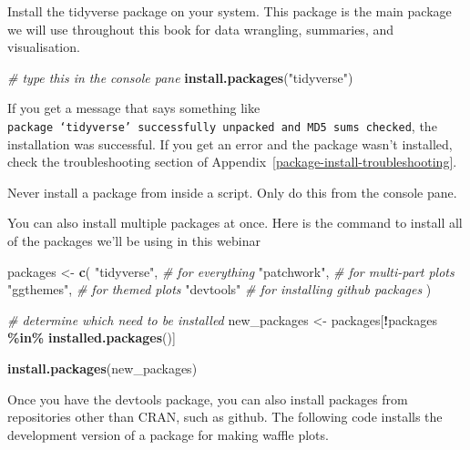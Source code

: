 \documentclass[
  oneside]{book}
\newenvironment{Shaded}{\begin{snugshade}}{\end{snugshade}}
\newcommand{\CommentTok}[1]{\textcolor[rgb]{0.56,0.35,0.01}{\textit{#1}}}
\newcommand{\FunctionTok}[1]{\textcolor[rgb]{0.13,0.29,0.53}{\textbf{#1}}}
\newcommand{\NormalTok}[1]{#1}
\newcommand{\OtherTok}[1]{\textcolor[rgb]{0.56,0.35,0.01}{#1}}
\newcommand{\SpecialCharTok}[1]{\textcolor[rgb]{0.81,0.36,0.00}{\textbf{#1}}}
\newcommand{\StringTok}[1]{\textcolor[rgb]{0.31,0.60,0.02}{#1}}
\begin{document}
Install the tidyverse package on your system. This package is the main package we will use throughout this book for data wrangling, summaries, and visualisation.

\begin{Shaded}
\begin{Highlighting}[]
\CommentTok{\# type this in the console pane}
\FunctionTok{install.packages}\NormalTok{(}\StringTok{"tidyverse"}\NormalTok{)}
\end{Highlighting}
\end{Shaded}

If you get a message that says something like \texttt{package\ ‘tidyverse’\ successfully\ unpacked\ and\ MD5\ sums\ checked}, the installation was successful. If you get an error and the package wasn't installed, check the troubleshooting section of Appendix~\ref{package-install-troubleshooting}.

\begin{dangerous}
Never install a package from inside a script. Only do this from the console pane.

\end{dangerous}

You can also install multiple packages at once. Here is the command to install all of the packages we'll be using in this webinar

\begin{Shaded}
\begin{Highlighting}[]
\NormalTok{packages }\OtherTok{\textless{}{-}} \FunctionTok{c}\NormalTok{(}
  \StringTok{"tidyverse"}\NormalTok{,  }\CommentTok{\# for everything}
  \StringTok{"patchwork"}\NormalTok{,  }\CommentTok{\# for multi{-}part plots}
  \StringTok{"ggthemes"}\NormalTok{,   }\CommentTok{\# for themed plots}
  \StringTok{"devtools"}    \CommentTok{\# for installing github packages}
\NormalTok{)}

\CommentTok{\# determine which need to be installed}
\NormalTok{new\_packages }\OtherTok{\textless{}{-}}\NormalTok{ packages[}\SpecialCharTok{!}\NormalTok{packages }\SpecialCharTok{\%in\%} \FunctionTok{installed.packages}\NormalTok{()]}

\FunctionTok{install.packages}\NormalTok{(new\_packages)}
\end{Highlighting}
\end{Shaded}

Once you have the devtools package, you can also install packages from repositories other than CRAN, such as github. The following code installs the development version of a package for making waffle plots.
\end{document}
